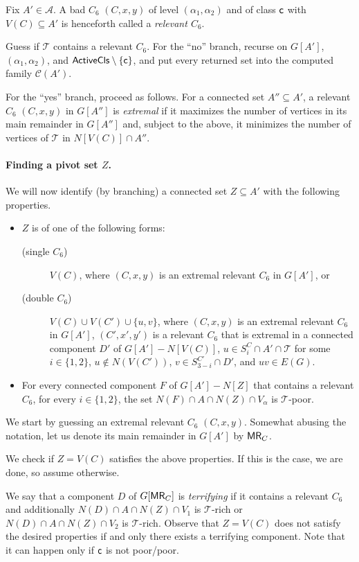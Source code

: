 \documentclass[11pt,a4paper]{article}
\theoremstyle{definition}
\def\T{\mathcal{T}}
\begin{document}
Fix $A' \in \mathcal{A}$.
A bad $C_6$ $(C,x,y)$ of level $(\alpha_1,\alpha_2)$ and of class $\mathsf{c}$
with $V(C) \subseteq A'$ is henceforth called a \emph{relevant $C_6$}.

Guess if $\T$ contains a relevant $C_6$.
For the ``no'' branch, recurse on $G[A']$, $(\alpha_1,\alpha_2)$, and $\mathsf{ActiveCls} \setminus \{\mathsf{c}\}$,
and put every returned set into the computed family $\mathcal{C}(A')$. 

For the ``yes'' branch, proceed as follows.
For a connected set $A'' \subseteq A'$, a relevant $C_6$ $(C,x,y)$ in $G[A'']$ is \emph{extremal}
if it maximizes the number of vertices in its main remainder in $G[A'']$ and,
subject to the above, it minimizes the number of vertices of $\T$ in $N[V(C)] \cap A''$. 

\paragraph{Finding a pivot set $Z$.}
We will now identify (by branching) a connected set $Z \subseteq A'$ with the following properties.
\begin{itemize}
\item $Z$ is of one of the following forms:
\begin{description}
 \item[(single $C_6$)] $V(C)$, where $(C,x,y)$ is an extremal relevant $C_6$ in $G[A']$, or
 \item[(double $C_6$)] $V(C) \cup V(C') \cup \{u,v\}$, where $(C,x,y)$ is an extremal relevant $C_6$ in $G[A']$, $(C',x',y')$ is a relevant $C_6$ that is 
 extremal in a connected component $D'$ of $G[A']-N[V(C)]$, $u \in S_i^C \cap A' \cap \T$ for some $i \in \{1,2\}$, $u \notin N(V(C'))$,
 $v \in S_{3-i}^{C'} \cap D'$, and $uv \in E(G)$.
\end{description}
\item For every connected component $F$ of $G[A']-N[Z]$ that contains a relevant $C_6$, for every $i \in \{1,2\}$, the set $N(F) \cap A \cap N(Z) \cap V_\alpha$ is $\T$-poor. 
\end{itemize}

We start by guessing an extremal relevant $C_6$ $(C,x,y)$.
Somewhat abusing the notation, let us denote its main remainder in $G[A']$ by $\mathsf{MR}_C$.

We check if $Z = V(C)$ satisfies the above properties. If this is the case, we are done, so assume otherwise. 

We say that a component $D$ of $G[\mathsf{MR}_C]$ is \emph{terrifying}
if it contains a relevant $C_6$ and additionally
$N(D) \cap A \cap N(Z) \cap V_1$ is $\T$-rich  
or $N(D) \cap A \cap N(Z) \cap V_2$ is $\T$-rich. 
Observe that $Z = V(C)$ does not satisfy the desired properties if and only there exists a terrifying component.
Note that it can happen only if $\mathsf{c}$ is not poor/poor.
\end{document}
